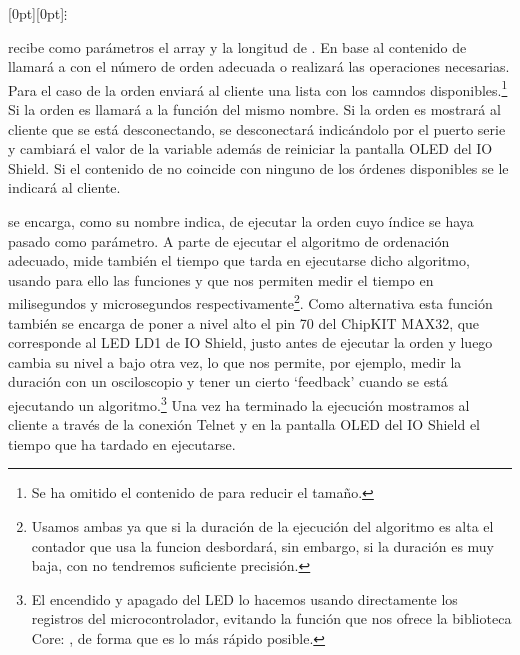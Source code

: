 
\centerline{\raisebox{-1pt}[0pt][0pt]{$\vdots$}}

 recibe como parámetros el array  y la longitud de . En base al contenido de  llamará a  con el número de orden adecuada o realizará las operaciones necesarias. Para el caso de la orden  enviará al cliente una lista con los camndos disponibles.\footnote{Se ha omitido el contenido de  para reducir el tamaño.} Si la orden es  llamará a la función del mismo nombre. Si la orden es  mostrará al cliente que se está desconectando, se desconectará indicándolo por el puerto serie y cambiará el valor de la variable  además de reiniciar la pantalla OLED del IO Shield. Si el contenido de  no coincide con ninguno de los órdenes disponibles se le indicará al cliente.


 se encarga, como su nombre indica, de ejecutar la orden cuyo índice se haya pasado como parámetro. A parte de ejecutar el algoritmo de ordenación adecuado,  mide también el tiempo que tarda en ejecutarse dicho algoritmo, usando para ello las funciones  y  que nos permiten medir el tiempo en milisegundos y microsegundos respectivamente\footnote{Usamos ambas ya que si la duración de la ejecución del algoritmo es alta el contador que usa la funcion  desbordará, sin embargo, si la duración es muy baja, con  no tendremos suficiente precisión.}. Como alternativa esta función también se encarga de poner a nivel alto el pin 70 del ChipKIT MAX32, que corresponde al LED LD1 de IO Shield, justo antes de ejecutar la orden y luego cambia su nivel a bajo otra vez, lo que nos permite, por ejemplo, medir la duración con un osciloscopio y tener un cierto `feedback' cuando se está ejecutando un algoritmo.\footnote{El encendido y apagado del LED lo hacemos usando directamente los registros del microcontrolador, evitando la función que nos ofrece la biblioteca Core: , de forma que es lo más rápido posible.} Una vez ha terminado la ejecución mostramos al cliente a través de la conexión Telnet y en la pantalla OLED del IO Shield el tiempo que ha tardado en ejecutarse.

